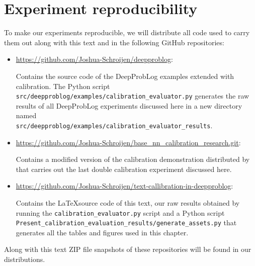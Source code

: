 \section{Experiment reproducibility}
To make our experiments reproducible, we will distribute all code used to carry them out along with this text and in the following GitHub repositories:
\begin{itemize}
  \item \url{https://github.com/Joshua-Schroijen/deepproblog}: \par Contains the source code of the DeepProbLog examples extended with calibration. The Python script \\ \texttt{src/deepproblog/examples/calibration\_evaluator.py} generates the raw results of all DeepProbLog experiments discussed here in a new directory named \\ \texttt{src/deepproblog/examples/calibration\_evaluator\_results}.
  \item \url{https://github.com/Joshua-Schroijen/base_nn_calibration_research.git}: \par
  Contains a modified version of the calibration demonstration distributed by \cite{guo2017calibration} that carries out the last double calibration experiment discussed here.
  \item \url{https://github.com/Joshua-Schroijen/text-callibration-in-deepproblog}: \par Contains the \LaTeX source code of this text, our raw results obtained by running the \texttt{calibration\_evaluator.py} script and a Python script \\ \texttt{Present\_calibration\_evaluation\_results/generate\_assets.py} that generates all the tables and figures used in this chapter.
\end{itemize}
Along with this text ZIP file snapshots of these repositories will be found in our distributions.